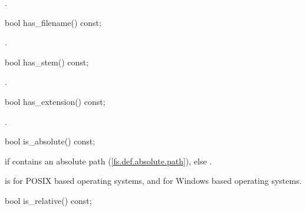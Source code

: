 \begin{itemdescr}
\pnum
\returns {}.
\end{itemdescr}

\begin{itemdecl}
bool has_filename() const;
\end{itemdecl}

\begin{itemdescr}
\pnum
\returns {}.
\end{itemdescr}

\begin{itemdecl}
bool has_stem() const;
\end{itemdecl}

\begin{itemdescr}
\pnum
\returns {}.
\end{itemdescr}

\begin{itemdecl}
bool has_extension() const;
\end{itemdecl}

\begin{itemdescr}
\pnum
\returns {}.
\end{itemdescr}

\begin{itemdecl}
bool is_absolute() const;
\end{itemdecl}

\begin{itemdescr}
\pnum
\returns {} if 
  contains an absolute path (\ref{fs.def.absolute.path}), else .

\pnum
\enterexample {} is
       for  POSIX based operating systems, and  for Windows based
operating systems. \exitexample
\end{itemdescr}

\begin{itemdecl}
bool is_relative() const;
\end{itemdecl}

